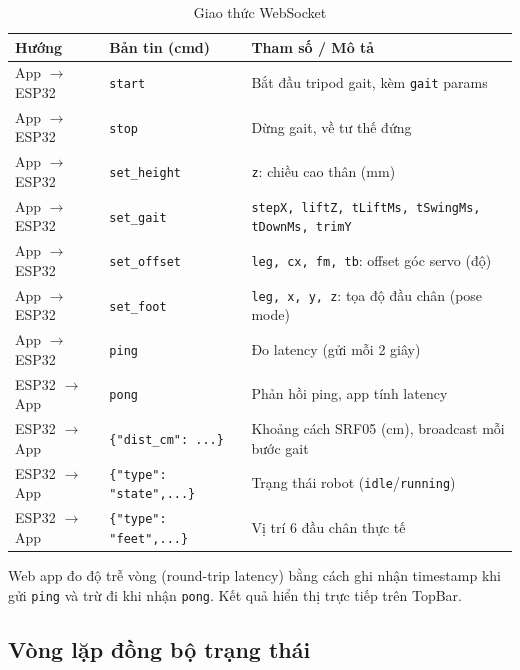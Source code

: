         \begin{table}[H]
        \centering
        \caption{Giao thức WebSocket}
        \label{tab:ws_protocol}
        \begin{tabular}{|>{\centering\arraybackslash}m{4cm}|>{\centering\arraybackslash}m{4cm}|>{\centering\arraybackslash}m{7cm}|}
        \hline
        \textbf{Hướng} & \textbf{Bản tin (cmd)} & \textbf{Tham số / Mô tả} \\
        \hline
        App $\to$ ESP32 & \texttt{start} & Bắt đầu tripod gait, kèm \texttt{gait} params \\
        App $\to$ ESP32 & \texttt{stop} & Dừng gait, về tư thế đứng \\
        App $\to$ ESP32 & \texttt{set\_height} & \texttt{z}: chiều cao thân (mm) \\
        App $\to$ ESP32 & \texttt{set\_gait} & \texttt{stepX, liftZ, tLiftMs, tSwingMs, tDownMs, trimY} \\
        App $\to$ ESP32 & \texttt{set\_offset} & \texttt{leg, cx, fm, tb}: offset góc servo (độ) \\
        App $\to$ ESP32 & \texttt{set\_foot} & \texttt{leg, x, y, z}: tọa độ đầu chân (pose mode) \\
        App $\to$ ESP32 & \texttt{ping} & Đo latency (gửi mỗi 2 giây) \\
        \hline
        ESP32 $\to$ App & \texttt{pong} & Phản hồi ping, app tính latency \\
        ESP32 $\to$ App & \texttt{\{"dist\_cm": ...\/\}} & Khoảng cách SRF05 (cm), broadcast mỗi bước gait \\
        ESP32 $\to$ App & \texttt{\{"type": "state",...\}} & Trạng thái robot (\texttt{idle}/\texttt{running}) \\
        ESP32 $\to$ App & \texttt{\{"type": "feet",...\}} & Vị trí 6 đầu chân thực tế \\
        \hline
        \end{tabular}
        \end{table}

        \hspace{0.5cm} Web app đo độ trễ vòng (round-trip latency) bằng cách ghi nhận timestamp khi gửi \texttt{ping} và trừ đi khi nhận \texttt{pong}. Kết quả hiển thị trực tiếp trên TopBar.

        \subsection{Vòng lặp đồng bộ trạng thái}

